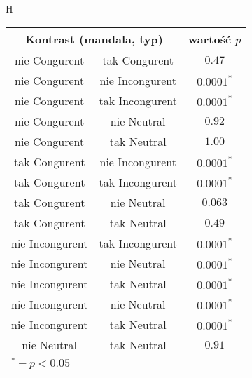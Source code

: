 \documentclass[12pt,a4paper,final,oneside,onecolumn,titlepage]{article}
\begin{document}
\begin{table}{H}
\begin{tabular}{c c c}
\multicolumn{2}{c}{Kontrast (mandala, typ)} & wartość $p$ \\
\hline
nie Congurent & tak Congurent & $0.47$ \\
nie Congurent & nie Incongurent & $0.0001^*$ \\
nie Congurent & tak Incongurent & $0.0001^*$ \\
nie Congurent & nie Neutral & $0.92$ \\
nie Congurent & tak Neutral & $1.00$ \\
tak Congurent & nie Incongurent & $0.0001^*$ \\
tak Congurent & tak Incongurent & $0.0001^*$ \\
tak Congurent & nie Neutral & $0.063$ \\
tak Congurent & tak Neutral & $0.49$ \\
nie Incongurent & tak Incongurent & $0.0001^*$ \\
nie Incongurent & nie Neutral & $0.0001^*$ \\
nie Incongurent & tak Neutral & $0.0001^*$ \\
nie Incongurent & nie Neutral & $0.0001^*$ \\
nie Incongurent & tak Neutral & $0.0001^*$ \\
nie Neutral & tak Neutral & $0.91$ \\ [1ex]
\hline
\multicolumn{3}{l}{\footnotesize{$^{*} - p<0.05$}}
\end{tabular}
\label{Tabela}
\end{table}
\end{document}
